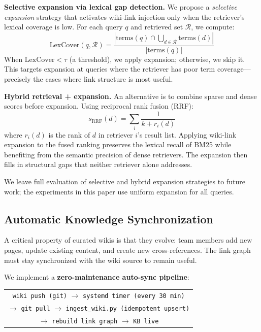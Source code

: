\documentclass[sigconf,review]{acmart}
\begin{document}
\textbf{Selective expansion via lexical gap detection.}
We propose a \emph{selective expansion} strategy that activates
wiki-link injection only when the retriever's lexical coverage is
low.  For each query $q$ and retrieved set $\mathcal{R}$, we compute:
\[
  \text{LexCover}(q, \mathcal{R}) = \frac{|\text{terms}(q) \cap \bigcup_{d \in \mathcal{R}} \text{terms}(d)|}{|\text{terms}(q)|}
\]
When $\text{LexCover} < \tau$ (a threshold), we apply expansion;
otherwise, we skip it.  This targets expansion at queries where the
retriever has poor term coverage---precisely the cases where link
structure is most useful.

\textbf{Hybrid retrieval + expansion.}
An alternative is to combine sparse and dense scores before expansion.
Using reciprocal rank fusion (RRF):
\[
  s_{\text{RRF}}(d) = \sum_{i} \frac{1}{k + r_i(d)}
\]
where $r_i(d)$ is the rank of $d$ in retriever $i$'s result list.
Applying wiki-link expansion to the fused ranking preserves the
lexical recall of BM25 while benefiting from the semantic precision
of dense retrievers.  The expansion then fills in structural gaps
that neither retriever alone addresses.

We leave full evaluation of selective and hybrid expansion strategies
to future work; the experiments in this paper use uniform expansion
for all queries.

\subsection{Automatic Knowledge Synchronization}
\label{sec:autosync}

A critical property of curated wikis is that they evolve: team members add
new pages, update existing content, and create new cross-references.  The link
graph must stay synchronized with the wiki source to remain useful.

We implement a \textbf{zero-maintenance auto-sync pipeline}:

\begin{center}
\begin{tabular}{c}
\texttt{wiki push (git)} $\rightarrow$ \texttt{systemd timer (every 30 min)} \\
$\rightarrow$ \texttt{git pull} $\rightarrow$ \texttt{ingest\_wiki.py (idempotent upsert)} \\
$\rightarrow$ \texttt{rebuild link graph} $\rightarrow$ \texttt{KB live}
\end{tabular}
\end{center}
\end{document}
